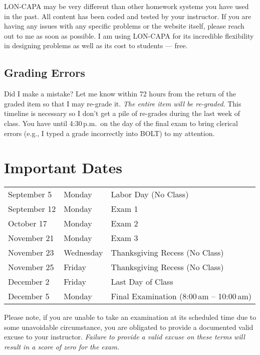 \documentclass[11pt,letterpaper]{article}
\begin{document}
LON-CAPA may be very different than other homework systems you have used in the
past. All content has been coded and tested by your instructor. If you are
having any issues with any specific problems or the website itself, please reach
out to me as soon as possible. I am using LON-CAPA for its incredible
flexibility in designing problems as well as its cost to students --- free.

\subsection{Grading Errors}
Did I make a mistake? Let me know within 72 hours from the return of the graded
item so that I may re-grade it. \emph{The entire item will be re-graded}. This
timeline is necessary so I don't get a pile of re-grades during the last week of
class. You have until 4:30\,p.m.\ on the day of the final exam to bring clerical
errors (e.g., I typed a grade incorrectly into BOLT) to my attention.

\section{Important Dates}\label{importantdates}
\begin{center}
	\begin{tabular} {l l l}
		September 5  & Monday     & Labor Day (No Class) \\
		September 12 & Monday     & Exam 1 \\
		October 17   & Monday     & Exam 2 \\
		November 21  & Monday     & Exam 3 \\
		November 23  & Wednesday  & Thanksgiving Recess (No Class) \\
		November 25  & Friday     & Thanksgiving Recess (No Class) \\
		December 2   & Friday     & Last Day of Class \\
		December 5   & Monday     & Final Examination (8:00\,am --
		10:00\,am)
	\end{tabular}
\end{center}

Please note, if you are unable to take an examination at
its scheduled time due to some unavoidable circumstance, you are obligated to
provide a documented valid excuse to your instructor. \emph{Failure to provide a
valid excuse on these terms will result in a score of zero for the 
exam.}
\end{document}
